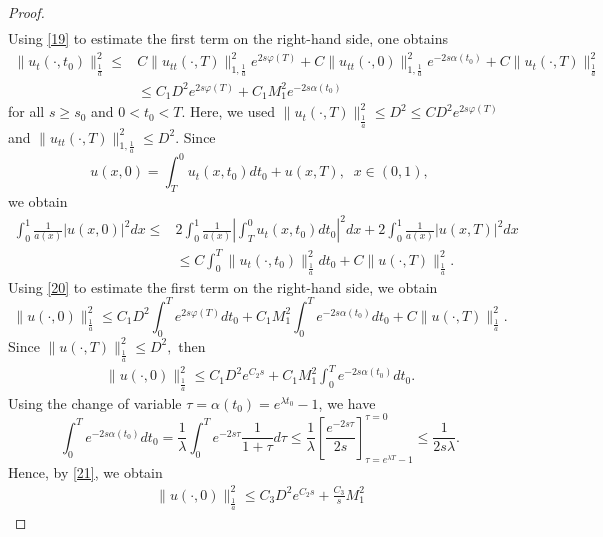 \documentclass[reqno]{amsart}
\theoremstyle{plain}
\theoremstyle{remark}
\numberwithin{equation}{section}
\begin{document}
\begin{proof}
\begin{align*}
    \end{align*}
Using \eqref{19} to estimate the first term on the right-hand side, one obtains
    \begin{equation}\label{20}
        \begin{aligned}
             \| u_{t}(\cdot,t_{0})\|_{\frac{1}{a}}^2\leqslant & C \| u_{tt}(\cdot,T)\|_{1,\frac{1}{a}}^2e^{2s\varphi(T)}+C\| u_{tt}(\cdot,0)\|_{1,\frac{1}{a}}^2 e^{-2s\alpha(t_{0})}+C\| u_{t}(\cdot,T)\|_{\frac{1}{a}}^2\\& \leqslant C_{1} D^2e^{2s\varphi(T)}+C_{1}M_{1}^2e^{-2s\alpha(t_{0})}
        \end{aligned}
    \end{equation}
    for all $s \geqslant s_{0}$ and $0<t_{0}<T.$  Here, we used $\| u_{t}(\cdot,T)\|_{\frac{1}{a}}^2\leqslant D^2 \leqslant CD^2e^{2s\varphi(T)}$ and $\| u_{tt}(\cdot,T)\|_{1,\frac{1}{a}}^2 \leqslant D^2$.
    Since 
    $$ u(x,0)=\int_{T}^0u_{t}(x,t_{0})dt_{0}+u(x,T), \;\; x \in (0,1),$$
    we obtain 
    \begin{align*}
        \int_{0}^1 \frac{1}{a(x)}\vert u(x,0)\vert^2dx\leqslant &  2 \int_{0}^1 \frac{1}{a(x)}\left\vert \int_{T}^0u_{t}(x,t_{0})dt_{0}\right\vert^2 dx +2 \int_{0}^1 \frac{1}{a(x)}\vert u(x,T)\vert^2dx \\ &\leqslant C \int_{0}^{T} \| u_{t}(\cdot,t_{0})\|_{\frac{1}{a}}^2dt_{0}+ C \| u(\cdot,T)\|_{\frac{1}{a}}^2.
    \end{align*}
Using \eqref{20} to estimate the first term on the right-hand side, we obtain
    $$ \| u(\cdot,0)\|_{\frac{1}{a}}^2\leqslant C_{1}D^2\int_{0}^T e^{2s\varphi(T)}dt_{0}+C_{1}M_{1}^2 \int_{0}^T e^{-2s\alpha(t_{0})}dt_{0}+C\| u(\cdot,T)\|_{\frac{1}{a}}^2.$$
    Since $\| u(\cdot,T)\|_{\frac{1}{a}}^2\leqslant D^2,$ then 
    \begin{align}\label{21}
        \| u(\cdot,0)\|_{\frac{1}{a}}^2\leqslant C_{1}D^2e^{C_{2}s}+ C_{1}M_{1}^2 \int_{0}^T e^{-2s\alpha(t_{0})}dt_{0}.
    \end{align}
Using the change of variable $\tau = \alpha(t_{0})= e^{\lambda t_{0}}-1$, we have
    $$ \int_{0}^T e^{-2s\alpha(t_{0})}dt_{0}=\frac{1}{\lambda} \int_{0}^Te^{-2s\tau}\frac{1}{1+\tau}d\tau \leqslant \frac{1}{\lambda}\left[\frac{e^{-2s\tau}}{2s}\right]_{\tau =e^{\lambda T}-1}^{\tau=0}\leqslant \frac{1}{2s\lambda}.$$
    Hence, by \eqref{21}, we obtain
    \begin{align}\label{22}
        \| u(\cdot,0)\|_{\frac{1}{a}}^2\leqslant C_{3}D^2e^{C_{2}s}+ \frac{C_{3}}{s}M_{1}^2
    \end{align}

\end{proof}
\end{document}
